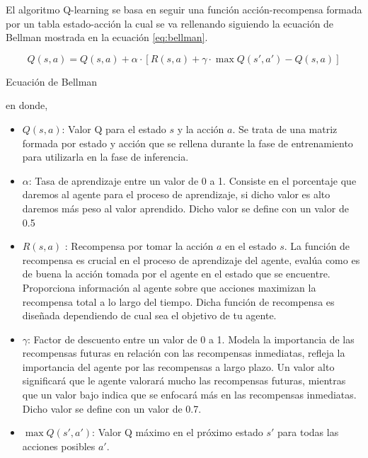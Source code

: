   El algoritmo Q-learning se basa en seguir una función acción-recompensa formada por un tabla estado-acción la cual se va rellenando siguiendo la ecuación
  de Bellman\cite{Bellman} mostrada en la ecuación \ref{eq:bellman}.
  \begin{myequation}[ht]
    \begin{equation}
      Q(s, a) = Q(s, a) + \alpha \cdot [R(s, a) + \gamma \cdot \max Q(s', a') - Q(s, a)]
      \label{eq:bellman}
    \end{equation}
    \caption{Ecuación de Bellman}
  \end{myequation}

  en donde, 

  \begin{itemize}
    \item \textbf{$Q(s, a)$}: Valor Q para el estado $s$ y la acción $a$. Se trata de una matriz formada por estado y acción que se rellena durante la fase de entrenamiento para utilizarla
    en la fase de inferencia.
    \item \textbf{$\alpha$}: Tasa de aprendizaje entre un valor de 0 a 1. Consiste en el porcentaje que daremos al agente para el proceso de aprendizaje, 
    si dicho valor es alto daremos más peso al valor aprendido. Dicho valor se define con un valor de 0.5 
    \item \textbf{$R(s, a)$ }: Recompensa por tomar la acción $a$ en el estado $s$. La función de recompensa es crucial en el proceso de aprendizaje del agente, 
    evalúa como es de buena la acción tomada por el agente en el estado que se encuentre. Proporciona información al agente sobre que acciones maximizan la recompensa total a lo largo del tiempo. Dicha función
    de recompensa es diseñada dependiendo de cual sea el objetivo de tu agente. 
    \item \textbf{$\gamma$}: Factor de descuento entre un valor de 0 a 1. Modela la importancia de las recompensas futuras en relación con las recompensas inmediatas, refleja la importancia del agente
    por las recompensas a largo plazo. Un valor alto significará que le agente valorará mucho las recompensas futuras, mientras que un valor bajo indica que se enfocará más en las recompensas
    inmediatas. Dicho valor se define con un valor de 0.7.
    \item \textbf{$\max Q(s', a')$}: Valor Q máximo en el próximo estado $s'$ para todas las acciones posibles $a'$.
\end{itemize}

